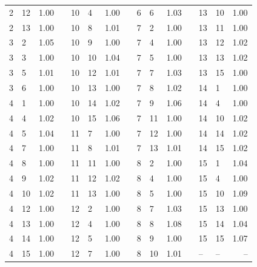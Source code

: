 \begin{xltabular}{0.9\linewidth}{llrp{0.2cm}llrp{0.2cm}llrp{0.2cm}llr}
    2 & 12 & 1.00 &  &  10 & 4 & 1.00 & & 6 & 6 & 1.03 & &  13 & 10 & 1.00 \\
    2 & 13 & 1.00 &  &  10 & 8 & 1.01 & & 7 & 2 & 1.00 & &  13 & 11 & 1.00 \\
    3 & 2 & 1.05  & &  10 & 9 & 1.00 & & 7 & 4 & 1.00 &  & 13 & 12 & 1.02 \\
    3 & 3 & 1.00  & &  10 & 10 & 1.04 & & 7 & 5 & 1.00 & &  13 & 13 & 1.02 \\
    3 & 5 & 1.01  & &  10 & 12 & 1.01 & & 7 & 7 & 1.03 & &  13 & 15 & 1.00 \\
    3 & 6 & 1.00  & &  10 & 13 & 1.00 & & 7 & 8 & 1.02 & &  14 & 1 & 1.00 \\
    4 & 1 & 1.00  & &  10 & 14 & 1.02 & & 7 & 9 & 1.06 & &  14 & 4 & 1.00 \\
    4 & 4 & 1.02  & &  10 & 15 & 1.06 & & 7 & 11 & 1.00 & & 14 & 10 & 1.02 \\
    4 & 5 & 1.04  & &  11 & 7 & 1.00 & & 7 & 12 & 1.00 & & 14 & 14 & 1.02 \\
    4 & 7 & 1.00  & &  11 & 8 & 1.01 & & 7 & 13 & 1.01 & & 14 & 15 & 1.02 \\
    4 & 8 & 1.00  & &  11 & 11 & 1.00 & & 8 & 2 & 1.00 & & 15 & 1 & 1.04 \\
    4 & 9 & 1.02  & &  11 & 12 & 1.02 & & 8 & 4 & 1.00 & & 15 & 4 & 1.00 \\
    4 & 10 & 1.02 &  &  11 & 13 & 1.00 & & 8 & 5 & 1.00 & & 15 & 10 & 1.09 \\
    4 & 12 & 1.00 &  &  12 & 2 & 1.00 & & 8 & 7 & 1.03 & & 15 & 13 & 1.00 \\
    4 & 13 & 1.00 &  &  12 & 4 & 1.00 & & 8 & 8 & 1.08 & & 15 & 14 & 1.04 \\
    4 & 14 & 1.00 &  &  12 & 5 & 1.00 & & 8 & 9 & 1.00 & & 15 & 15 & 1.07 \\
    4 & 15 & 1.00 &  &  12 & 7 & 1.00 & & 8 & 10 & 1.01 & & -- & -- &  -- \\
    \bottomrule
\end{xltabular}

